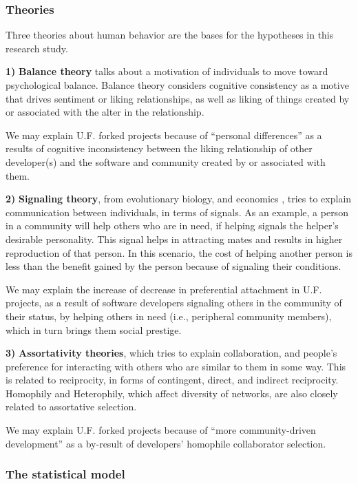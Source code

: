 \documentclass{acm_proc_article-sp}
\begin{document}
\subsubsection{Theories}
Three theories about human behavior are the bases for the hypotheses in this research study.

\textbf{1)} \textbf{Balance theory} \cite{Heider} talks about a motivation of individuals to move toward psychological balance. Balance theory considers cognitive consistency as a motive that drives sentiment or liking relationships, as well as liking of things created by or associated with the alter in the relationship.

We may explain U.F. forked projects because of ``personal differences'' as a results of cognitive inconsistency between the liking relationship of other developer(s) and the software and community created by or associated with them. 

\textbf{2)} \textbf{Signaling theory}, from evolutionary biology, and economics \cite{Spence}, tries to explain communication between individuals, in terms of signals. As an example, a person in a community will help others who are in need, if helping signals the helper's desirable personality. This signal helps in attracting mates and results in higher reproduction of that person. In this scenario, the cost of helping another person is less than the benefit gained by the person because of signaling their conditions. 

We may explain the increase of decrease in preferential attachment in U.F. projects, as a result of software developers signaling others in the community of their status, by helping others in need (i.e., peripheral community members), which in turn brings them social prestige.

\textbf{3)} \textbf{Assortativity theories}, which tries to explain collaboration, and people's preference for interacting with others who are similar to them in some way. This is related to reciprocity, in forms of contingent, direct, and indirect reciprocity. Homophily and Heterophily, which affect diversity of networks, are also closely related to assortative selection.

We may explain U.F. forked projects because of ``more community-driven development'' as a by-result of developers' homophile collaborator selection.


\subsubsection{The statistical model}
\end{document}
